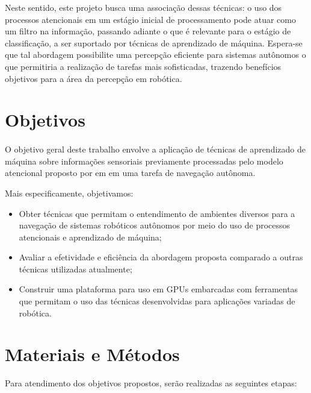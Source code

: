 \documentclass[11pt]{article}
\begin{document}
Neste sentido, este projeto busca uma associação dessas técnicas: o uso dos 
processos atencionais em um estágio inicial de processamento pode atuar como um 
filtro na informação, passando adiante o que é relevante para o estágio de
classificação, a ser suportado por técnicas de aprendizado de máquina. 
Espera-se que tal abordagem possibilite uma percepção eficiente para sistemas 
autônomos o que permitiria a realização de tarefas mais sofisticadas, trazendo 
benefícios objetivos para a área da percepção em robótica.

\section{Objetivos}
\paragraph{}
O objetivo geral deste trabalho envolve a aplicação de técnicas de aprendizado 
de máquina sobre informações sensoriais previamente processadas pelo modelo 
atencional proposto por em \cite{esther} em uma tarefa de navegação autônoma.  

Mais especificamente, objetivamos:
\begin{itemize}
	\item Obter técnicas que permitam o entendimento de ambientes
		diversos para a navegação de sistemas robóticos autônomos por meio 
		do uso de processos atencionais e aprendizado de máquina;
	\item Avaliar a efetividade e eficiência da abordagem proposta
		comparado a outras técnicas utilizadas atualmente;
	\item Construir uma plataforma para uso em GPUs embarcadas com 
		ferramentas que permitam o uso das técnicas desenvolvidas para
		aplicações variadas de robótica.
\end{itemize}

\section{Materiais e Métodos}

Para atendimento dos objetivos propostos, serão realizadas as seguintes etapas:
\end{document}
